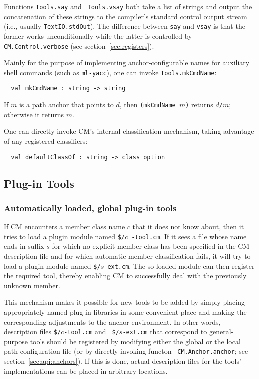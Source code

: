  Functions {\tt Tools.say} and {\tt
Tools.vsay} both take a list of strings and output the concatenation
of these strings to the compiler's standard control output stream
(i.e., usually {\tt TextIO.stdOut}).  The difference between {\tt say}
and {\tt vsay} is that the former works unconditionally while the
latter is controlled by {\tt CM.Control.verbose} (see
section~\ref{sec:registers}).

 Mainly for the purpose of
implementing anchor-configurable names for auxiliary shell commands
(such as {\tt ml-yacc}), one can invoke {\tt Tools.mkCmdName}:

\begin{verbatim}
  val mkCmdName : string -> string
\end{verbatim}

If $m$ is a path anchor that points to $d$, then {\tt (mkCmdName $m$)}
returns $d${\tt /}$m$; otherwise it returns $m$.

 One can
directly invoke CM's internal classification mechanism, taking
advantage of any registered classifiers:

\begin{verbatim}
  val defaultClassOf : string -> class option
\end{verbatim}

\subsection{Plug-in Tools}
\label{sec:plugintools}

\subsubsection{Automatically loaded, global plug-in tools}

If CM encounters a member class name $c$ that it does not know about,
then it tries to load a plugin module named {\tt \$/}$c${\tt
-tool.cm}.  If it sees a file whose name ends in suffix $s$ for which
no explicit member class has been specified in the CM description file
and for which automatic member classification fails, it will try to
load a plugin module named {\tt \$/}$s${\tt -ext.cm}.  The so-loaded
module can then register the required tool, thereby enabling CM to
successfully deal with the previously unknown member.

This mechanism makes it possible for new tools to be added by simply
placing appropriately named plug-in libraries in some convenient place
and making the corresponding adjustments to the anchor environment.
In other words, description files {\tt \$/}$c${\tt -tool.cm} and {\tt
\$/}$s${\tt -ext.cm} that correspond to general-purpose tools should
be registered by modifying either the global or the local path
configuration file (or by directly invoking functon {\tt
CM.Anchor.anchor}; see section~\ref{sec:api:anchors}).  If this is
done, actual description files for the tools' implementations can be
placed in arbitrary locations.

